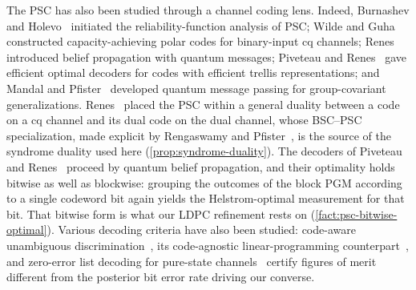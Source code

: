 \documentclass[11pt]{article}
\theoremstyle{remark}
\begin{document}
The PSC has also been studied through a channel coding lens. Indeed, Burnashev and Holevo~\cite{BH98} initiated the reliability-function analysis of PSC; Wilde and Guha~\cite{WG13} constructed capacity-achieving polar codes for binary-input cq channels; Renes~\cite{Ren17} introduced belief propagation with quantum messages; Piveteau and Renes~\cite{PR25} gave efficient optimal decoders for codes with efficient trellis representations; and Mandal and Pfister~\cite{MP26} developed quantum message passing for group-covariant generalizations. Renes~\cite{Ren18} placed the PSC within a general duality between a code on a cq channel and its dual code on the dual channel, whose BSC--PSC specialization, made explicit by Rengaswamy and Pfister~\cite{RP21}, is the source of the syndrome duality used here (\cref{prop:syndrome-duality}). The decoders of Piveteau and Renes~\cite{PR25} proceed by quantum belief propagation, and their optimality holds bitwise as well as blockwise: grouping the outcomes of the block PGM according to a single codeword bit again yields the Helstrom-optimal measurement for that bit. That bitwise form is what our LDPC refinement rests on (\cref{fact:psc-bitwise-optimal}). Various decoding criteria have also been studied: code-aware unambiguous discrimination~\cite{MSPJ26}, its code-agnostic linear-programming counterpart~\cite{BC25}, and zero-error list decoding for pure-state channels~\cite{DGL26} certify figures of merit different from the posterior bit error rate driving our converse.
\end{document}
